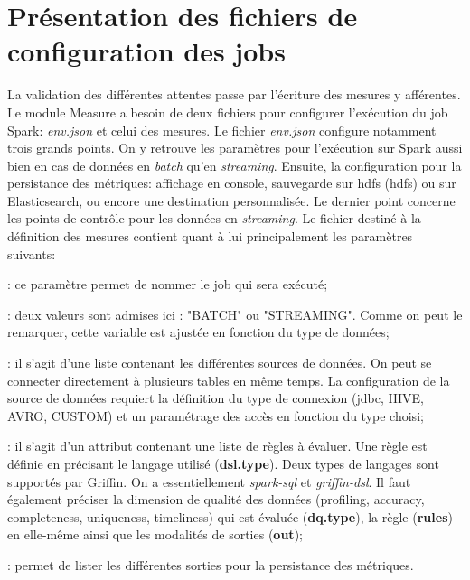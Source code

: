 \section{Pr\'esentation des fichiers de configuration des jobs}
La validation des diff\'erentes attentes passe par l'\'ecriture des mesures y aff\'erentes. Le module Measure a besoin de deux fichiers pour configurer l'ex\'ecution du job Spark: \emph{env.json} et celui des mesures. Le fichier \emph{env.json} configure notamment trois grands points. On y retrouve les param\`etres pour l'ex\'ecution sur Spark aussi bien en cas de donn\'ees en \textit{batch} qu'en \textit{streaming}. Ensuite, la configuration pour la persistance des m\'etriques: affichage en console, sauvegarde sur \acrshort{hdfs} (\acrlong{hdfs}) ou sur Elasticsearch, ou encore une destination personnalis\'ee. Le dernier point concerne les points de contr\^ole pour les donn\'ees en \textit{streaming}. 
Le fichier destin\'e \`a la d\'efinition des mesures contient quant \`a lui principalement les param\`etres suivants:
\begin{description}[parsep=0cm,itemsep=0cm]
\item[name] : ce param\`etre permet de nommer le job qui sera ex\'ecut\'e; 
\item[process.type]: deux valeurs sont admises ici :  "BATCH" ou "STREAMING". Comme on peut le remarquer, cette variable est ajust\'ee en fonction du type de donn\'ees; 
\item[data.sources] : il s'agit d'une liste contenant les diff\'erentes sources de donn\'ees. On peut se connecter directement \`a plusieurs tables en m\^eme temps. La configuration de la source de donn\'ees requiert la d\'efinition du type de connexion (\acrshort{jdbc}, HIVE, AVRO, CUSTOM) et un paramétrage des acc\`es en fonction du type choisi; 

\item[evaluate.rule] : il s'agit d'un attribut contenant une liste de r\`egles \`a \'evaluer. Une r\`egle est d\'efinie en pr\'ecisant le langage utilis\'e (\textbf{dsl.type}). Deux types de langages sont support\'es par Griffin. On a  essentiellement \emph{spark-sql} et \emph{griffin-dsl}. Il faut \'egalement pr\'eciser la dimension de qualit\'e des donn\'ees (profiling, accuracy, completeness, uniqueness, timeliness) qui est \'evalu\'ee (\textbf{dq.type}), la r\`egle (\textbf{rules}) en elle-m\^eme ainsi que les modalit\'es de sorties (\textbf{out});
\item[sinks]: permet de lister les diff\'erentes sorties pour la persistance des m\'etriques.
\end{description}
\vspace{0.15cm}


